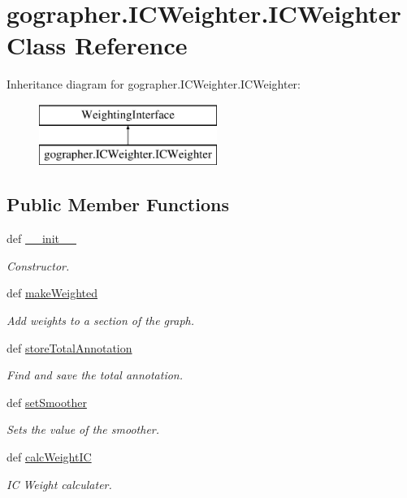 \hypertarget{classgographer_1_1_i_c_weighter_1_1_i_c_weighter}{\section{gographer.\-I\-C\-Weighter.\-I\-C\-Weighter Class Reference}
\label{classgographer_1_1_i_c_weighter_1_1_i_c_weighter}
}
Inheritance diagram for gographer.\-I\-C\-Weighter.\-I\-C\-Weighter\-:\begin{figure}[H]
\begin{center}
\leavevmode
\includegraphics[height=2.000000cm]{classgographer_1_1_i_c_weighter_1_1_i_c_weighter}
\end{center}
\end{figure}
\subsection*{Public Member Functions}
\begin{DoxyCompactItemize}
\item 
def \hyperlink{classgographer_1_1_i_c_weighter_1_1_i_c_weighter_a15ad494473c790a537ceb9890b9c2cc9}{\-\_\-\-\_\-init\-\_\-\-\_\-}
\begin{DoxyCompactList}\small\item\em Constructor. \end{DoxyCompactList}\item 
def \hyperlink{classgographer_1_1_i_c_weighter_1_1_i_c_weighter_af7f896983bac7b5bb2964a0bcc5bc18e}{make\-Weighted}
\begin{DoxyCompactList}\small\item\em Add weights to a section of the graph. \end{DoxyCompactList}\item 
def \hyperlink{classgographer_1_1_i_c_weighter_1_1_i_c_weighter_a55a98a616492095eed595ac860a9f3ed}{store\-Total\-Annotation}
\begin{DoxyCompactList}\small\item\em Find and save the total annotation. \end{DoxyCompactList}\item 
def \hyperlink{classgographer_1_1_i_c_weighter_1_1_i_c_weighter_aeedafa8c96e8ac53f09152ed7f1290b6}{set\-Smoother}
\begin{DoxyCompactList}\small\item\em Sets the value of the smoother. \end{DoxyCompactList}\item 
def \hyperlink{classgographer_1_1_i_c_weighter_1_1_i_c_weighter_afad5dbed27ead4ad86ad00453eb806fd}{calc\-Weight\-I\-C}
\begin{DoxyCompactList}\small\item\em I\-C Weight calculater. \end{DoxyCompactList}\end{DoxyCompactItemize}
